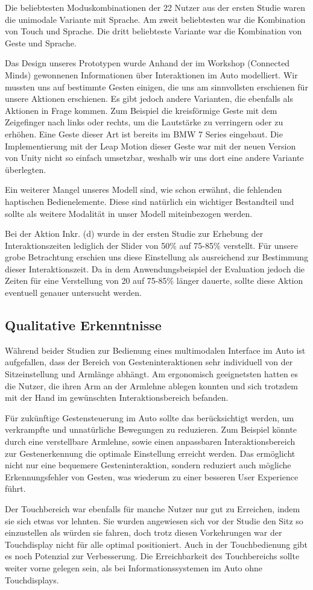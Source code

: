 Die beliebtesten Moduskombinationen der 22 Nutzer aus der ersten Studie waren die unimodale Variante mit Sprache. Am zweit beliebtesten war die Kombination von Touch und Sprache. Die dritt beliebteste Variante war die Kombination von Geste und Sprache. 

Das Design unseres Prototypen wurde Anhand der im Workshop (Connected Minds) gewonnenen Informationen über Interaktionen im Auto modelliert. Wir mussten uns auf bestimmte Gesten einigen, die uns am sinnvollsten erschienen für unsere Aktionen erschienen. Es gibt jedoch andere Varianten, die ebenfalls als Aktionen in Frage kommen. Zum Beispiel die kreisförmige Geste mit dem Zeigefinger nach links oder rechts, um die Lautstärke zu verringern oder zu erhöhen. Eine Geste dieser Art ist bereits im BMW 7 Series eingebaut. Die Implementierung mit der Leap Motion dieser Geste war mit der neuen Version von Unity nicht so einfach umsetzbar, weshalb wir uns dort eine andere Variante überlegten.

Ein weiterer Mangel unseres Modell sind, wie schon erwähnt, die fehlenden haptischen Bedienelemente. Diese sind natürlich ein wichtiger Bestandteil und sollte als weitere Modalität in unser Modell miteinbezogen werden. 

Bei der Aktion Inkr. (d) wurde in der ersten Studie zur Erhebung der Interaktionszeiten lediglich der Slider von 50\% auf 75-85\% verstellt. Für unsere grobe Betrachtung erschien uns diese Einstellung als ausreichend zur Bestimmung dieser Interaktionszeit. Da in dem Anwendungsbeispiel der Evaluation jedoch die Zeiten für eine Verstellung von 20 auf 75-85\% länger dauerte, sollte diese Aktion eventuell genauer untersucht werden. 

\subsection[Qualitative Erkenntnisse]{Qualitative Erkenntnisse}
Während beider Studien zur Bedienung eines multimodalen Interface im Auto ist aufgefallen, dass der Bereich von Gesteninteraktionen sehr individuell von der Sitzeinstellung und Armlänge abhängt. Am ergonomisch geeignetsten hatten es die Nutzer, die ihren Arm an der Armlehne ablegen konnten und sich trotzdem mit der Hand im gewünschten Interaktionsbereich befanden. 

Für zukünftige Gestensteuerung im Auto sollte das berücksichtigt werden, um verkrampfte und unnatürliche Bewegungen zu reduzieren. Zum Beispiel könnte durch eine verstellbare Armlehne, sowie einen anpassbaren Interaktionsbereich zur Gestenerkennung die optimale Einstellung erreicht werden. Das ermöglicht nicht nur eine bequemere Gesteninteraktion, sondern reduziert auch mögliche Erkennungsfehler von Gesten, was wiederum zu einer besseren User Experience führt.

Der Touchbereich war ebenfalls für manche Nutzer nur gut zu Erreichen, indem sie sich etwas vor lehnten. Sie  wurden angewiesen sich vor der Studie den Sitz so einzustellen als würden sie fahren, doch trotz diesen Vorkehrungen war der Touchdisplay nicht für alle optimal positioniert. Auch in der Touchbedienung gibt es noch Potenzial zur Verbesserung. Die Erreichbarkeit des Touchbereichs sollte weiter vorne gelegen sein, als bei Informationssystemen im Auto ohne Touchdisplays.